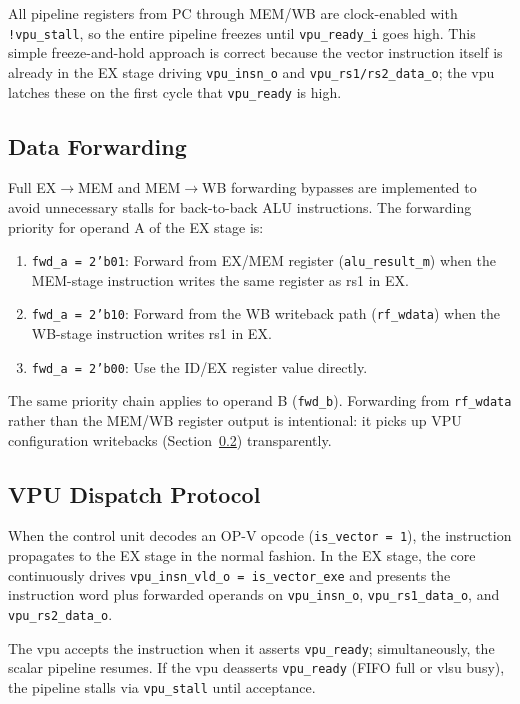 All pipeline registers from PC through MEM/WB are clock-enabled with
\texttt{!vpu\_stall}, so the entire pipeline freezes until \texttt{vpu\_ready\_i} goes
high. This simple freeze-and-hold approach is correct because the vector instruction
itself is already in the EX stage driving \texttt{vpu\_insn\_o} and \texttt{vpu\_rs1/rs2\_data\_o};
the \gls{vpu} latches these on the first cycle that \texttt{vpu\_ready} is high.

\subsection{Data Forwarding}
\label{subsec:forwarding}

Full EX$\to$MEM and MEM$\to$WB forwarding bypasses are implemented to avoid
unnecessary stalls for back-to-back ALU instructions. The forwarding priority for
operand A of the EX stage is:

\begin{enumerate}
  \item \texttt{fwd\_a = 2'b01}: Forward from EX/MEM register (\texttt{alu\_result\_m})
        when the MEM-stage instruction writes the same register as rs1 in EX.
  \item \texttt{fwd\_a = 2'b10}: Forward from the WB writeback path (\texttt{rf\_wdata})
        when the WB-stage instruction writes rs1 in EX.
  \item \texttt{fwd\_a = 2'b00}: Use the ID/EX register value directly.
\end{enumerate}

The same priority chain applies to operand B (\texttt{fwd\_b}). Forwarding from
\texttt{rf\_wdata} rather than the MEM/WB register output is intentional: it picks up
VPU configuration writebacks (Section~\ref{subsec:vpu_dispatch}) transparently.

\subsection{VPU Dispatch Protocol}
\label{subsec:vpu_dispatch}

When the control unit decodes an OP-V opcode (\texttt{is\_vector = 1}), the instruction
propagates to the EX stage in the normal fashion. In the EX stage, the core continuously
drives \texttt{vpu\_insn\_vld\_o = is\_vector\_exe} and presents the instruction word
plus forwarded operands on \texttt{vpu\_insn\_o}, \texttt{vpu\_rs1\_data\_o}, and
\texttt{vpu\_rs2\_data\_o}.

The \gls{vpu} accepts the instruction when it asserts \texttt{vpu\_ready}; simultaneously,
the scalar pipeline resumes. If the \gls{vpu} deasserts \texttt{vpu\_ready} (FIFO full
or \gls{vlsu} busy), the pipeline stalls via \texttt{vpu\_stall} until acceptance.

